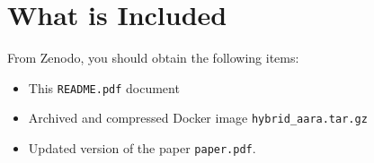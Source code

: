 
\section{What is Included}

From Zenodo, you should obtain the following items:
\begin{itemize}
  \item This \texttt{README.pdf} document
  \item Archived and compressed Docker image \texttt{hybrid\_aara.tar.gz}
  \item Updated version of the paper \texttt{paper.pdf}.
\end{itemize}
